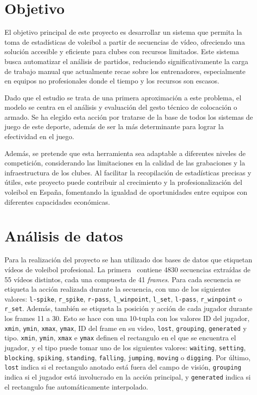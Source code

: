 \documentclass[12pt]{report} %
\begin{document}
    
    \chapter{Objetivo}
    \label{chap:metodos}

    El objetivo principal de este proyecto es desarrollar un sistema que
    permita la toma de estadísticas de voleibol a partir de secuencias de
    vídeo, ofreciendo una solución accesible y eficiente para clubes con
    recursos limitados. Este sistema busca automatizar el análisis de partidos,
    reduciendo significativamente la carga de trabajo manual que actualmente
    recae sobre los entrenadores, especialmente en equipos no profesionales
    donde el tiempo y los recursos son escasos.

    Dado que el estudio se trata de una primera aproximación a este problema,
    el modelo se centra en el análisis y evaluación del gesto técnico de
    colocación o armado. Se ha elegido esta acción por tratarse de la base de
    todos los sistemas de juego de este deporte, además de ser la más
    determinante para lograr la efectividad en el juego.

    Además, se pretende que esta herramienta sea adaptable a diferentes niveles de
    competición, considerando las limitaciones en la calidad de las grabaciones y
    la infraestructura de los clubes. Al facilitar la recopilación de estadísticas
    precisas y útiles, este proyecto puede contribuir al crecimiento y la
    profesionalización del voleibol en España, fomentando la igualdad de
    oportunidades entre equipos con diferentes capacidades económicas.


    \chapter{Análisis de datos}
    \label{cahp:datos}
    Para la realización del proyecto se han utilizado dos bases de datos que
    etiquetan vídeos de voleibol profesional. La primera~\cite{dataset1} contiene 4830
    secuencias extraídas de 55 vídeos distintos, cada una compuesta de 41
    \textit{frames}. Para cada secuencia se etiqueta la acción realizada durante
    la secuencia, con uno de los siguientes valores: \verb!l-spike!,
    \verb!r_spike!, \verb!r-pass!, \verb!l_winpoint!, \verb!l_set!,
    \verb!l-pass!, \verb!r_winpoint! o \verb!r_set!. Además, también se etiqueta
    la posición y acción de cada jugador durante los frames 11 a 30. Esto se
    hace con una 10-tupla con los valores ID del jugador, \verb!xmin!,
    \verb!ymin!, \verb!xmax!, \verb!ymax!, ID del frame en su video,
    \verb!lost!, \verb!grouping!, \verb!generated! y tipo. \verb!xmin!,
    \verb!ymin!, \verb!xmax! e \verb!ymax! definen el rectangulo en el que se
    encuentra el jugador, y el tipo puede tomar uno de los siguientes valores:
    \verb!waiting!, \verb!setting!, \verb!blocking!, \verb!spiking!,
    \verb!standing!, \verb!falling!, \verb!jumping!, \verb!moving! o
    \verb!digging!. Por último, \verb!lost! indica si el rectangulo anotado está
    fuera del campo de visión, \verb!grouping! indica si el jugador está
    involucrado en la acción principal, y \verb!generated! indica si el
    rectangulo fue automáticamente interpolado.
\end{document}
